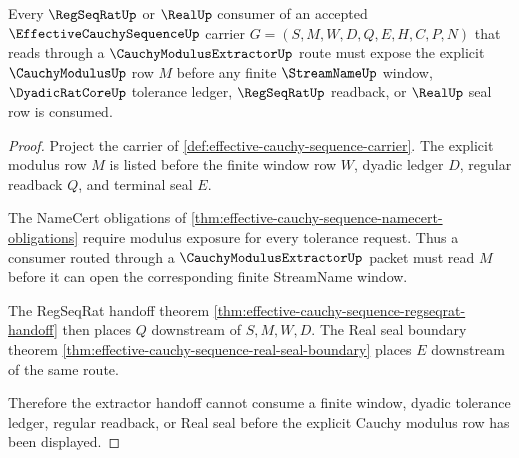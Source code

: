 \begin{theorem}\label{thm:effective-cauchy-sequence-extractor-handoff}
Every $\RegSeqRatUp$ or $\RealUp$ consumer of an accepted $\EffectiveCauchySequenceUp$ carrier $G=(S,M,W,D,Q,E,H,C,P,N)$ that reads through a $\CauchyModulusExtractorUp$ route must expose the explicit $\CauchyModulusUp$ row $M$ before any finite $\StreamNameUp$ window, $\DyadicRatCoreUp$ tolerance ledger, $\RegSeqRatUp$ readback, or $\RealUp$ seal row is consumed.
\end{theorem}
\begin{proof}
Project the carrier of \autoref{def:effective-cauchy-sequence-carrier}. The explicit modulus row $M$ is listed before the finite window row $W$, dyadic ledger $D$, regular readback $Q$, and terminal seal $E$.

The NameCert obligations of \autoref{thm:effective-cauchy-sequence-namecert-obligations} require modulus exposure for every tolerance request. Thus a consumer routed through a $\CauchyModulusExtractorUp$ packet must read $M$ before it can open the corresponding finite StreamName window.

The RegSeqRat handoff theorem \autoref{thm:effective-cauchy-sequence-regseqrat-handoff} then places $Q$ downstream of $S,M,W,D$. The Real seal boundary theorem \autoref{thm:effective-cauchy-sequence-real-seal-boundary} places $E$ downstream of the same route.

Therefore the extractor handoff cannot consume a finite window, dyadic tolerance ledger, regular readback, or Real seal before the explicit Cauchy modulus row has been displayed.
\end{proof}

